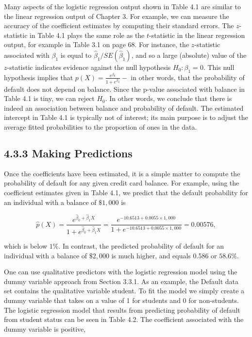 \documentclass[10pt]{article}
\begin{document}
Many aspects of the logistic regression output shown in Table 4.1 are similar to the linear regression output of Chapter 3. For example, we can measure the accuracy of the coefficient estimates by computing their standard errors. The $z$-statistic in Table 4.1 plays the same role as the $t$-statistic in the linear regression output, for example in Table 3.1 on page 68. For instance, the $z$-statistic associated with $\beta_{1}$ is equal to $\hat{\beta}_{1} / S E\left(\hat{\beta}_{1}\right)$, and so a large (absolute) value of the $z$-statistic indicates evidence against the null hypothesis $H_{0}: \beta_{1}=0$. This null hypothesis implies that $p(X)=\frac{e^{\beta_{0}}}{1+e^{\beta_{0}}}-$ in other words, that the probability of default does not depend on balance. Since the p-value associated with balance in Table 4.1 is tiny, we can reject $H_{0}$. In other words, we conclude that there is indeed an association between balance and probability of default. The estimated intercept in Table 4.1 is typically not of interest; its main purpose is to adjust the average fitted probabilities to the proportion of ones in the data.

\subsection*{4.3.3 Making Predictions}
Once the coefficients have been estimated, it is a simple matter to compute the probability of default for any given credit card balance. For example, using the coefficient estimates given in Table 4.1, we predict that the default probability for an individual with a balance of $\$ 1,000$ is

$$
\hat{p}(X)=\frac{e^{\hat{\beta}_{0}+\hat{\beta}_{1} X}}{1+e^{\hat{\beta}_{0}+\hat{\beta}_{1} X}}=\frac{e^{-10.6513+0.0055 \times 1,000}}{1+e^{-10.6513+0.0055 \times 1,000}}=0.00576,
$$

which is below $1 \%$. In contrast, the predicted probability of default for an individual with a balance of $\$ 2,000$ is much higher, and equals 0.586 or $58.6 \%$.

One can use qualitative predictors with the logistic regression model using the dummy variable approach from Section 3.3.1. As an example, the Default data set contains the qualitative variable student. To fit the model we simply create a dummy variable that takes on a value of 1 for students and 0 for non-students. The logistic regression model that results from predicting probability of default from student status can be seen in Table 4.2. The coefficient associated with the dummy variable is positive,
\end{document}
